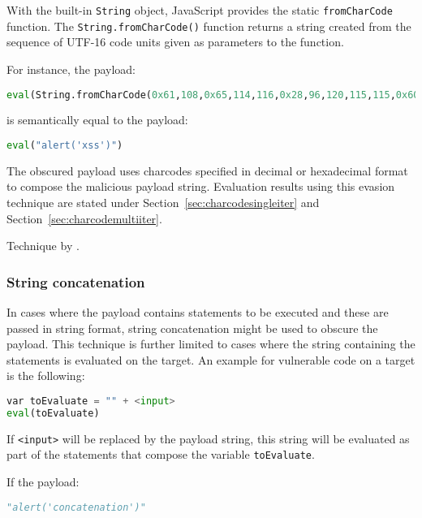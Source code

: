 With the built-in \verb|String| object, JavaScript provides the static \verb|fromCharCode| function. The \verb|String.fromCharCode()| function returns a string created from the sequence of UTF-16 code units given as parameters to the function. \cite{js/fromCharCode}

For instance, the payload:

\begin{lstlisting}[style=basicStyle, language=Python]
eval(String.fromCharCode(0x61,108,0x65,114,116,0x28,96,120,115,115,0x60,0x29))
\end{lstlisting}

is semantically equal to the payload:

\begin{lstlisting}[style=basicStyle, language=Python]
eval("alert('xss')")
\end{lstlisting}

The obscured payload uses charcodes specified in decimal or hexadecimal format to compose the malicious payload string. Evaluation results using this evasion technique are stated under Section~\ref{sec:charcodesingleiter} and Section~\ref{sec:charcodemultiiter}.

Technique by \cite{asecsite/jsobf1}.

\subsubsection{String concatenation}
In cases where the payload contains statements to be executed and these are passed in string format, string concatenation might be used to obscure the payload. This technique is further limited to cases where the string containing the statements is evaluated on the target. An example for vulnerable code on a target is the following:

\begin{lstlisting}[style=basicStyle, language=Python]
var toEvaluate = "" + <input>
eval(toEvaluate)
\end{lstlisting}

If \verb|<input>| will be replaced by the payload string, this string will be evaluated as part of the statements that compose the variable \verb|toEvaluate|.

If the payload:

\begin{lstlisting}[style=basicStyle, language=Python]
"alert('concatenation')"
\end{lstlisting}

